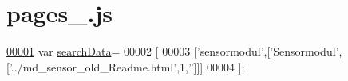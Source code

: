 \hypertarget{pages__2_8js_source}{}\section{pages\+\_.\+js}
\label{pages__2_8js_source}

\begin{DoxyCode}
\hypertarget{pages__2_8js_source.tex_l00001}{}\hyperlink{pages__2_8js_ad01a7523f103d6242ef9b0451861231e}{00001} var \hyperlink{pages__2_8js_ad01a7523f103d6242ef9b0451861231e}{searchData}=
00002 [
00003   [\textcolor{stringliteral}{'sensormodul'},[\textcolor{stringliteral}{'Sensormodul'},[\textcolor{stringliteral}{'../md\_sensor\_old\_Readme.html'},1,\textcolor{stringliteral}{''}]]]
00004 ];
\end{DoxyCode}
